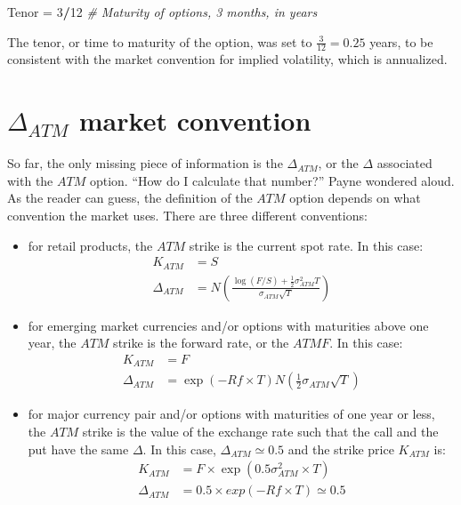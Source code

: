 \documentclass[]{book}
\newenvironment{Shaded}{\begin{snugshade}}{\end{snugshade}}
\newcommand{\DecValTok}[1]{\textcolor[rgb]{0.00,0.00,0.81}{#1}}
\newcommand{\StringTok}[1]{\textcolor[rgb]{0.31,0.60,0.02}{#1}}
\newcommand{\CommentTok}[1]{\textcolor[rgb]{0.56,0.35,0.01}{\textit{#1}}}
\newcommand{\OperatorTok}[1]{\textcolor[rgb]{0.81,0.36,0.00}{\textbf{#1}}}
\newcommand{\NormalTok}[1]{#1}
\theoremstyle{definition}
\theoremstyle{definition}
\theoremstyle{definition}
\theoremstyle{remark}
\begin{document}
\begin{Shaded}
\begin{Highlighting}[]
\NormalTok{Tenor =}\StringTok{ }\DecValTok{3}\OperatorTok{/}\DecValTok{12}   \CommentTok{# Maturity of options, 3 months, in years}
\end{Highlighting}
\end{Shaded}

The tenor, or time to maturity of the option, was set to
\(\frac{3}{12} = 0.25\) years, to be consistent with the market
convention for implied volatility, which is annualized.

\section{\texorpdfstring{\(\Delta_{ATM}\) market
convention}{\textbackslash{}Delta\_\{ATM\} market convention}}\label{delta_atm-market-convention}

So far, the only missing piece of information is the \(\Delta_{ATM}\),
or the \(\Delta\) associated with the \(ATM\) option. ``How do I
calculate that number?'' Payne wondered aloud. As the reader can guess,
the definition of the \(ATM\) option depends on what convention the
market uses. There are three different conventions:

\begin{itemize}
\item
  for retail products, the \(ATM\) strike is the current spot rate. In
  this case:\\
  \[
  \begin{aligned}
  K_{ATM} &= S\\
  \Delta_{ATM} &= N \left(\frac{\log(F/S) + \frac{1}{2} \sigma_{ATM}^2 T}{\sigma_{ATM} \sqrt T} \right)
  \end{aligned}
  \]
\item
  for emerging market currencies and/or options with maturities above
  one year, the \(ATM\) strike is the forward rate, or the \(ATMF\). In
  this case: \[
  \begin{aligned}
  K_{ATM} &= F\\
  \Delta_{ATM} &= \exp(-Rf \times T)N(\frac{1}{2}\sigma_{ATM} \sqrt T) 
  \end{aligned}
  \]
\item
  for major currency pair and/or options with maturities of one year or
  less, the \(ATM\) strike is the value of the exchange rate such that
  the call and the put have the same \(\Delta\). In this case,
  \(\Delta_{ATM} \simeq 0.5\) and the strike price \(K_{ATM}\) is:\\
  \[
  \begin{aligned}
   K_{ATM} &= F \times \exp\left( 0.5 \sigma^2_{ATM}\times T \right)\\
   \Delta_{ATM} &= 0.5\times exp(-Rf \times T) \simeq 0.5 
  \end{aligned}
  \]
\end{itemize}
\end{document}
